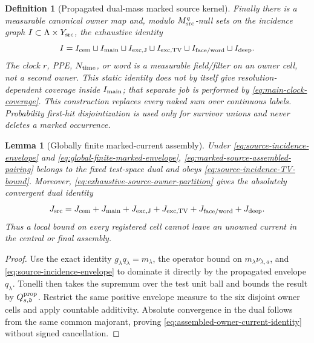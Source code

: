 \documentclass[11pt]{article}
\newtheorem{lemma}[theorem]{Lemma}
\newtheorem{definition}[theorem]{Definition}
\begin{document}
\begin{definition}[Propagated dual-mass marked source kernel]
Finally there is a measurable canonical owner map and, modulo
$M_{\rm src}^{q}$-null sets on the incidence graph
$I\subset\Lambda\times Y_{\rm src}$, the exhaustive identity
\begin{equation}
\label{eq:exhaustive-source-owner-partition}
 I=I_{\rm cem}\sqcup I_{\rm main}\sqcup
 I_{\rm exc,J}\sqcup I_{\rm exc,TV}\sqcup
 I_{\rm face/word}\sqcup I_{\rm deep}.
\end{equation}
The clock $r$, PPE, $N_{\rm time}$, or word is a measurable field/filter on
an owner cell, not a second owner.  This static identity does not by itself
give resolution-dependent coverage inside $I_{\rm main}$; that separate job
is performed by \eqref{eq:main-clock-coverage}.  This construction replaces every
naked sum over continuous labels.  Probability first-hit disjointization is
used only for survivor unions and never deletes a marked occurrence.
\end{definition}

\begin{lemma}[Globally finite marked-current assembly]
\label{lem:globally-finite-marked-current}
Under \eqref{eq:source-incidence-envelope} and
\eqref{eq:global-finite-marked-envelope},
\eqref{eq:marked-source-assembled-pairing} belongs to the fixed test-space
dual and obeys \eqref{eq:source-incidence-TV-bound}.  Moreover,
\eqref{eq:exhaustive-source-owner-partition} gives the absolutely convergent
dual identity
\begin{equation}
\label{eq:assembled-owner-current-identity}
 J_{\rm src}=J_{\rm cem}+J_{\rm main}+J_{\rm exc,J}+J_{\rm exc,TV}
              +J_{\rm face/word}+J_{\rm deep}.
\end{equation}
Thus a local bound on every registered cell cannot leave an unowned current
in the central or final assembly.
\end{lemma}

\begin{proof}
Use the exact identity $g_\lambda q_\lambda=m_\lambda$, the operator bound on
$m_\lambda\nu_{\lambda,a}$, and
\eqref{eq:source-incidence-envelope} to dominate it directly by the
propagated envelope $q_\lambda$.  Tonelli then takes the supremum over the
test unit ball and bounds the result by $Q_{s,\mathfrak d}^{\rm prop}$.
Restrict the same positive envelope measure to the six disjoint owner cells
and apply countable additivity.  Absolute convergence in the dual follows
from the same common majorant, proving
\eqref{eq:assembled-owner-current-identity} without signed cancellation.
\end{proof}
\end{document}
